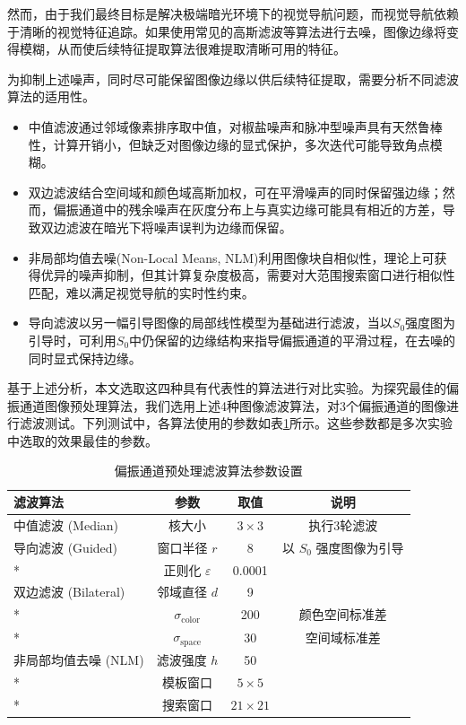 然而，由于我们最终目标是解决极端暗光环境下的视觉导航问题，而视觉导航依赖于清晰的视觉特征追踪。如果使用常见的高斯滤波等算法进行去噪，图像边缘将变得模糊，从而使后续特征提取算法很难提取清晰可用的特征。

为抑制上述噪声，同时尽可能保留图像边缘以供后续特征提取，需要分析不同滤波算法的适用性。
\begin{itemize}
    \item 中值滤波通过邻域像素排序取中值，对椒盐噪声和脉冲型噪声具有天然鲁棒性，计算开销小，但缺乏对图像边缘的显式保护，多次迭代可能导致角点模糊。
    \item 双边滤波\cite{tomasi1998bilateral}结合空间域和颜色域高斯加权，可在平滑噪声的同时保留强边缘；然而，偏振通道中的残余噪声在灰度分布上与真实边缘可能具有相近的方差，导致双边滤波在暗光下将噪声误判为边缘而保留。
    \item 非局部均值去噪\cite{buades2005nlm}(Non-Local Means, NLM)利用图像块自相似性，理论上可获得优异的噪声抑制，但其计算复杂度极高，需要对大范围搜索窗口进行相似性匹配，难以满足视觉导航的实时性约束。
    \item 导向滤波\cite{he2013guided}以另一幅引导图像的局部线性模型为基础进行滤波，当以$S_0$强度图为引导时，可利用$S_0$中仍保留的边缘结构来指导偏振通道的平滑过程，在去噪的同时显式保持边缘。
\end{itemize}

基于上述分析，本文选取这四种具有代表性的算法进行对比实验。为探究最佳的偏振通道图像预处理算法，我们选用上述4种图像滤波算法，对3个偏振通道的图像进行滤波测试。下列测试中，各算法使用的参数如表\ref{tab:filter_params}所示。这些参数都是多次实验中选取的效果最佳的参数。

\begin{table}[htbp]
\centering
\caption{偏振通道预处理滤波算法参数设置}
\label{tab:filter_params}
\begin{tabular}{@{}lccc@{}}
\toprule
滤波算法 & 参数 & 取值 & 说明 \\
\midrule
中值滤波 (Median)     & 核大小        & $3\times 3$  & 执行3轮滤波 \\
\addlinespace
导向滤波 (Guided)     & 窗口半径 $r$  & 8            & 以 $S_0$ 强度图像为引导 \\*
                     & 正则化 $\varepsilon$ & 0.0001 & \\
\addlinespace
双边滤波 (Bilateral)  & 邻域直径 $d$  & 9           & \\*
                     & $\sigma_{\text{color}}$ & 200  & 颜色空间标准差 \\*
                     & $\sigma_{\text{space}}$ & 30   & 空间域标准差 \\
\addlinespace
非局部均值去噪 (NLM)  & 滤波强度 $h$  & 50           & \\*
                     & 模板窗口       & $5\times 5$  & \\*
                     & 搜索窗口       & $21\times 21$ & \\
\bottomrule
\end{tabular}
\end{table}


